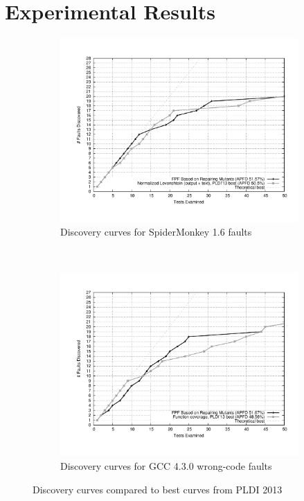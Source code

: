 \section{Experimental Results}

\begin{figure}[t!]
    \centering
    \begin{subfigure}[t]{0.5\textwidth}
        \centering
        \includegraphics[width=1.02\textwidth]{jscurve}
        \caption{Discovery curves for SpiderMonkey 1.6 faults}
        \label{jscurves}
    \end{subfigure}%
    ~ 
    \begin{subfigure}[t]{0.5\textwidth}
        \centering
        \includegraphics[width=1.02\textwidth]{gcccurve}
        \caption{Discovery curves for GCC 4.3.0 wrong-code faults}
        \label{gcccurves}
    \end{subfigure}
    \caption{Discovery curves compared to best curves from PLDI 2013}
\end{figure}


